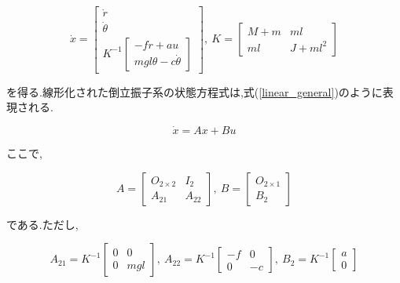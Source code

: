 \begin{equation}
    \dot x = 
    \left[
        \begin{array}{c}
            \dot{r} \\
            \dot{\theta} \\
            K^{-1}
            \left[
                \begin{array}{c}
                    -f \dot{r} + au \\
                    mgl \theta - c \dot{\theta}
                \end{array}
            \right]
        \end{array}    
    \right],\
    K = 
    \left[
        \begin{array}{cc}
            M + m  &  ml \\
            ml     &  J + ml^2
        \end{array}
    \right]
    \label{linear_k}
\end{equation}

を得る.線形化された倒立振子系の状態方程式は,式(\ref{linear_general})のように表現される.

\begin{equation}
    \dot x = Ax + Bu
    \label{linear_general}
\end{equation}

ここで,

$$
    A = 
    \left[
        \begin{array}{cc}
            O_{2 \times 2}  &  I_{2} \\
            A_{21}          &  A_{22}
        \end{array}
    \right],\
    B = 
     \left[
        \begin{array}{c}
            O_{2 \times 1} \\
            B_{2}
        \end{array}
    \right]
$$

である.ただし,

$$
    A_{21} = K^{-1}
    \left[
        \begin{array}{cc}
            0  &  0 \\
            0  &  mgl
        \end{array}    
    \right],\
    A_{22} = K^{-1}
    \left[
        \begin{array}{cc}
            -f  &  0 \\
            0   &  -c
        \end{array}    
    \right],\
    B_{2} = K^{-1}
    \left[
        \begin{array}{c}
            a \\
            0
        \end{array}    
    \right]
$$

